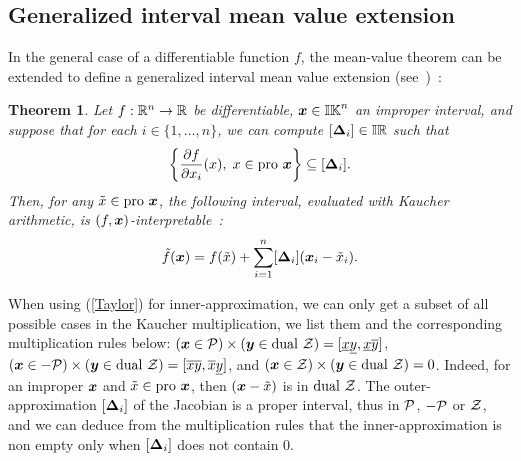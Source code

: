 \documentclass{sig-alternate-05-2015}
\newtheorem{theorem}{Theorem}
\newcommand{\dual}{\mbox{dual }}
\newcommand{\pro}{\mbox{pro }}
\def\bbr{{\Bbb R}}
\def\I{{\Bbb I \Bbb R}}
\def\K{{\Bbb I \Bbb K}}
\begin{document}
\subsection{Generalized interval mean value extension}
\label{generalizedmean}
In the general case of a differentiable function $f$, the mean-value theorem can be extended to define 
a generalized interval mean value extension (see~\cite{gold1})~:
\begin{theorem}
\label{thm1}
Let $f : \bbr^n \rightarrow \bbr$ be differentiable, $\x \in \K^n$ an improper interval, 
and suppose that for each $i \in \{1,\ldots,n\}$, we can compute $[\bfm{\Delta}_i] \in \I$ such that 
\begin{equation} 
\left\{ \frac{\partial f}{\partial x_i} (x), \; x \in \pro \x \right\} 
\subseteq [\bfm{\Delta}_i].
\label{delta1} 
\end{equation}
Then, for any $\tilde x \in \pro \x$, the following interval, evaluated with Kaucher arithmetic, is $(f,\x)$-interpretable~:
\begin{equation}
\tilde{f}(\x) = f(\tilde x) + \sum\limits_{i=1}^{n} [\bfm{\Delta}_i] (\x_i - \tilde{x}_i).
\label{Taylor}
\end{equation}
\end{theorem}

When using (\ref{Taylor}) for inner-approximation, we can only get a subset of all possible cases in the Kaucher multiplication,
we list them and the corresponding multiplication rules below: 
$(\x \in {\cal P}) \times (\y \in \dual {\cal Z})=[\underline x \underline y, \underline x \overline y]$, 
 $(\x \in -{\cal P}) \times (\y \in \dual {\cal Z})=[\overline x \overline y, \overline x \underline y]$, 
and  $(\x \in {\cal Z}) \times (\y \in \dual {\cal Z})=0$.
Indeed, for an improper $\x$ and $\tilde x \in \pro \x$, then $(\x - \tilde{x})$ is in $\dual {\cal Z}$. 
The outer-approximation  $[\bfm{\Delta}_i] $ of the Jacobian is a proper interval, thus in ${\cal P}$, $-{\cal P}$ or ${\cal Z}$, 
and we can deduce from the multiplication rules that the inner-approximation is non empty only when $[\bfm{\Delta}_i]$ does not contain 0.
\end{document}
